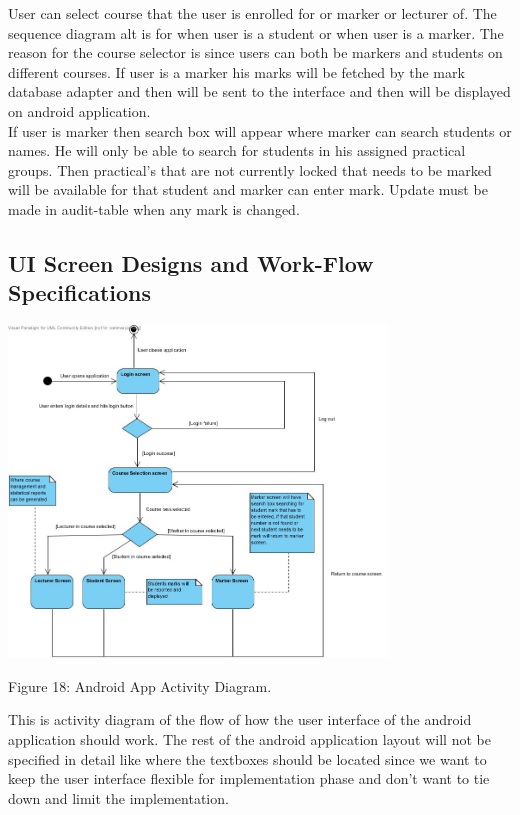 \documentclass[a4paper]{article}
\begin{document}
User can select course that the user is enrolled for or marker or lecturer of. The sequence diagram alt is for when user is a student or when user is a marker. The reason for the course selector is since users can both be markers and students on different courses.  If user is a marker his marks will be fetched by the mark database adapter and then will be sent to the interface and then will be displayed on android application.\\
If user is marker then search box will appear where marker can search students or names. He will only be able to search for students in his assigned practical groups. Then practical’s that are not currently locked that needs to be marked will be available for that student and marker can enter mark. Update must be made in audit-table when any mark is changed.


\subsection*{UI Screen Designs and Work-Flow Specifications}
\includegraphics[width=380px]{Images/APPUI1.jpg}
\begin{center}
Figure 18: Android App Activity Diagram.
\end{center}

This is activity diagram of the flow of how the user interface of the android application should work. The rest of the android application layout will not be specified in detail like where the textboxes should be located since we want to keep the user interface flexible for implementation phase and don’t want to tie down and limit the implementation.
\end{document}

